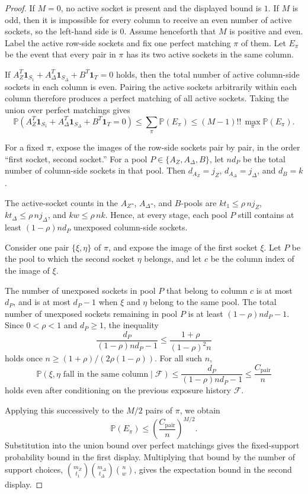 \documentclass[11pt]{article}
\theoremstyle{definition}
\newcommand{\PP}{\mathbb P}
\newcommand{\ones}{\mathbf 1}
\begin{document}
\begin{proof}
If \(M=0\), no active socket is present and the displayed bound is \(1\). If \(M\) is odd, then it is impossible for every column to receive an even number of active sockets, so the left-hand side is \(0\). Assume henceforth that \(M\) is positive and even.
Label the active row-side sockets and fix one perfect matching \(\pi\) of them. Let \(E_\pi\) be the event that every pair in \(\pi\) has its two active sockets in the same column.

If \(A_Z^T\ones_{S_1}+A_\Delta^T\ones_{S_\Delta}+B^T\ones_T=0\) holds, then the total number of active column-side sockets in each column is even. Pairing the active sockets arbitrarily within each column therefore produces a perfect matching of all active sockets. Taking the union over perfect matchings gives
\[
\PP(A_Z^T\ones_{S_1}+A_\Delta^T\ones_{S_\Delta}+B^T\ones_T=0)
\le \sum_{\pi}\PP(E_\pi)
\le (M-1)!!\,\max_{\pi}\PP(E_\pi).
\]

For a fixed \(\pi\), expose the images of the row-side sockets pair by pair, in the order ``first socket, second socket.'' For a pool \(P\in\{A_Z,A_\Delta,B\}\), let \(n d_P\) be the total number of column-side sockets in that pool. Then \(d_{A_Z}=j_Z\), \(d_{A_\Delta}=j_\Delta\), and \(d_B=k\).

The active-socket counts in the \(A_Z\)-, \(A_\Delta\)-, and \(B\)-pools are \(kt_1\le \rho\, n j_Z\), \(kt_\Delta\le \rho\, n j_\Delta\), and \(kw\le \rho\, nk\). Hence, at every stage, each pool \(P\) still contains at least \((1-\rho) n d_P\) unexposed column-side sockets.

Consider one pair \(\{\xi,\eta\}\) of \(\pi\), and expose the image of the first socket \(\xi\). Let \(P\) be the pool to which the second socket \(\eta\) belongs, and let \(c\) be the column index of the image of \(\xi\).

The number of unexposed sockets in pool \(P\) that belong to column \(c\) is at most \(d_P\), and is at most \(d_P-1\) when \(\xi\) and \(\eta\) belong to the same pool. The total number of unexposed sockets remaining in pool \(P\) is at least \((1-\rho) n d_P-1\). Since \(0<\rho<1\) and \(d_P\ge1\), the inequality
\[
\frac{d_P}{(1-\rho) n d_P-1}
\le
\frac{1+\rho}{(1-\rho)^2 n}
\]
holds once \(n\ge (1+\rho)/(2\rho(1-\rho))\). For all such \(n\),
\[
\PP(\xi,\eta\text{ fall in the same column}\mid \mathcal F)
\le
\frac{d_P}{(1-\rho) n d_P-1}
\le
\frac{C_{\mathrm{pair}}}{n}
\]
holds even after conditioning on the previous exposure history \(\mathcal F\).

Applying this successively to the \(M/2\) pairs of \(\pi\), we obtain
\[
\PP(E_\pi)\le \left(\frac{C_{\mathrm{pair}}}{n}\right)^{M/2}.
\]
Substitution into the union bound over perfect matchings gives the fixed-support probability bound in the first display. Multiplying that bound by the number of support choices, \(\binom{m_Z}{t_1}\binom{m_\Delta}{t_\Delta}\binom{n}{w}\), gives the expectation bound in the second display.
\end{proof}
\end{document}
